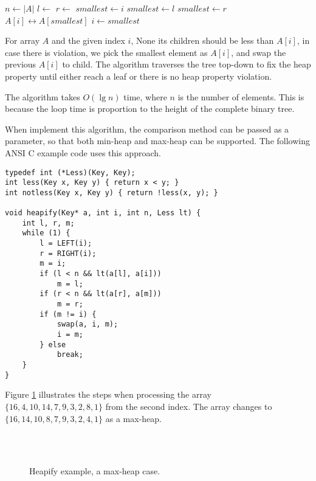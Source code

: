 \documentclass{article}
\begin{document}
\begin{algorithmic}[1]
  \State $n \gets |A|$
  \Loop
    \State $l \gets$ 
    \State $r \gets$ 
    \State $smallest \gets i$
      \State $smallest \gets l$
    \EndIf
      \State $smallest \gets r$
    \EndIf
      \State {} $A[i] \leftrightarrow A[smallest]$
      \State $i \gets smallest$
    \Else
      \State \Return
    \EndIf
  \EndLoop
\EndFunction
\end{algorithmic}

For array $A$ and the given index $i$, None its children
should be less than $A[i]$, in case there is violation, we pick the smallest
element as $A[i]$, and swap the previous $A[i]$ to child.
The algorithm traverses the tree top-down to fix the heap property
until either reach a leaf or there is no heap property violation.

The  algorithm takes $O(\lg n)$ time, where
$n$ is the number of elements. This
is because the loop time is proportion to the height of the complete binary tree.

When implement this algorithm, the comparison method can be passed as
a parameter, so that both min-heap and max-heap can be supported.
The following ANSI C example code uses this approach.

\begin{lstlisting}
typedef int (*Less)(Key, Key);
int less(Key x, Key y) { return x < y; }
int notless(Key x, Key y) { return !less(x, y); }

void heapify(Key* a, int i, int n, Less lt) {
    int l, r, m;
    while (1) {
        l = LEFT(i);
        r = RIGHT(i);
        m = i;
        if (l < n && lt(a[l], a[i]))
            m = l;
        if (r < n && lt(a[r], a[m]))
            m = r;
        if (m != i) {
            swap(a, i, m);
            i = m;
        } else
            break;
    }
}
\end{lstlisting}

Figure \ref{fig:heapify} illustrates the steps when  processing the
array $\{16, 4, 10, 14, 7, 9, 3, 2, 8, 1\}$ from the second index. The array changes to
$\{16, 14, 10, 8, 7, 9, 3, 2, 4, 1\}$ as a max-heap.

\begin{figure}[htbp]
    \centering
     \\
     \\
    \caption{Heapify example, a max-heap case.} \label{fig:heapify}
\end{figure}
\end{document}
